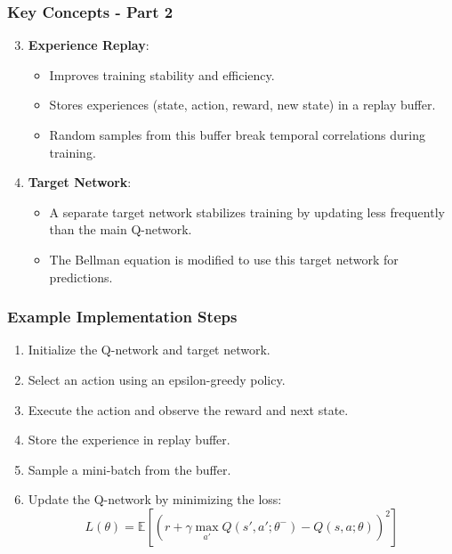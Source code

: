 \documentclass{beamer}
\begin{document}
\begin{frame}[fragile]
    \frametitle{Key Concepts - Part 2}
    \begin{enumerate}
        \setcounter{enumi}{2}
        \item \textbf{Experience Replay}:
        \begin{itemize}
            \item Improves training stability and efficiency.
            \item Stores experiences (state, action, reward, new state) in a replay buffer.
            \item Random samples from this buffer break temporal correlations during training.
        \end{itemize}

        \item \textbf{Target Network}:
        \begin{itemize}
            \item A separate target network stabilizes training by updating less frequently than the main Q-network.
            \item The Bellman equation is modified to use this target network for predictions.
        \end{itemize}
    \end{enumerate}
\end{frame}

\begin{frame}[fragile]
    \frametitle{Example Implementation Steps}
    \begin{enumerate}
        \item Initialize the Q-network and target network.
        \item Select an action using an epsilon-greedy policy.
        \item Execute the action and observe the reward and next state.
        \item Store the experience in replay buffer.
        \item Sample a mini-batch from the buffer.
        \item Update the Q-network by minimizing the loss:
        \begin{equation}
            L(\theta) = \mathbb{E}[(r + \gamma \max_{a'} Q(s', a'; \theta^-) - Q(s, a; \theta))^2]
        \end{equation}
    \end{enumerate}
\end{frame}
\end{document}
